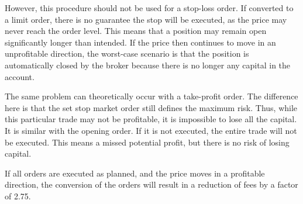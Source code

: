 However, this procedure should not be used for a stop-loss order.
If converted to a limit order, there is no guarantee the stop will be executed, as the price may never reach the order level.
This means that a position may remain open significantly longer than intended.
If the price then continues to move in an unprofitable direction, the worst-case scenario is that the position is automatically closed by the broker because there is no longer any capital in the account.

The same problem can theoretically occur with a take-profit order.
The difference here is that the set stop market order still defines the maximum risk.
Thus, while this particular trade may not be profitable, it is impossible to lose all the capital.
It is similar with the opening order.
If it is not executed, the entire trade will not be executed.
This means a missed potential profit, but there is no risk of losing capital.

If all orders are executed as planned, and the price moves in a profitable direction, the conversion of the orders will result in a reduction of fees by a factor of 2.75.